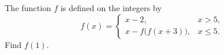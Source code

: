 The function $f$ is defined on the integers by
\[
f(x)=\begin{cases}x-2,& x>5,\\ x-f\bigl(f(x+3)\bigr),& x\le5.\end{cases}
\]
Find $f(1)$.
